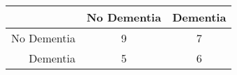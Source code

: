 \begin{table}[ht]
\centering
\begin{tabular}{r|c|c}
  \hline
 & No Dementia & Dementia \\ 
  \hline
No Dementia & 9 & 7 \\ 
  Dementia & 5 & 6 \\ 
   \hline
\end{tabular}
\end{table}
